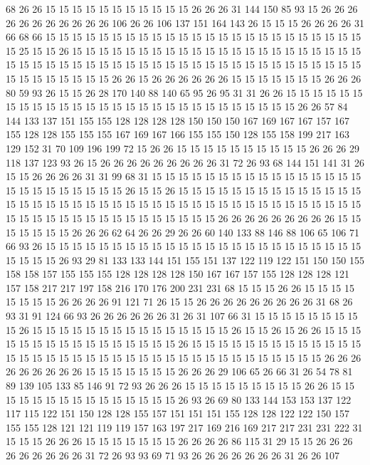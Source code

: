 68 26 26 15 15 15 15 15 15 15 15 15 15 15 26 26 26 31 144 150
85 93 15 26 26 26 26 26 26 26 26 26 26 26 106 26 26 106 137 151
164 143 26 15 15 15 26 26 26 26 31 66 68 66 15 15 15 15 15 15
15 15 15 15 15 15 15 15 15 15 15 15 15 15 15 15 15 15 15 25
15 15 26 15 15 15 15 15 15 15 15 15 15 15 15 15 15 15 15 15
15 15 15 15 15 15 15 15 15 15 15 15 15 15 15 15 15 15 15 15
15 15 15 15 15 15 15 15 15 15 15 15 15 15 15 15 15 15 15 15
26 26 15 26 26 26 26 26 26 15 15 15 15 15 15 15 26 26 26 80
59 93 26 15 15 26 28 170 140 88 140 65 95 26 95 31 31 26 26 15
15 15 15 15 15 15 15 15 15 15 15 15 15 15 15 15 15 15 15 15
15 15 15 15 15 15 15 26 26 57 84 144 133 137 151 155 155 128 128 128
128 150 150 150 167 169 167 167 157 167 155 128 128 155 155 155 167 169 167 166
155 155 150 128 155 158 199 217 163 129 152 31 70 109 196 199 72 15 26 26
15 15 15 15 15 15 15 15 15 15 26 26 26 29 118 137 123 93 26 15
26 26 26 26 26 26 26 26 26 31 72 26 93 68 144 151 141 31 26 15
15 26 26 26 26 31 31 99 68 31 15 15 15 15 15 15 15 15 15 15
15 15 15 15 15 15 15 15 15 15 15 15 15 15 15 26 15 15 26 15
15 15 15 15 15 15 15 15 15 15 15 15 15 15 15 15 15 15 15 15
15 15 15 15 15 15 15 15 15 15 15 15 15 15 15 15 15 15 15 15
15 15 15 15 15 15 15 15 15 15 15 15 15 15 15 15 26 26 26 26
26 26 26 26 26 15 15 15 15 15 15 15 26 26 26 62 64 26 26 29
26 26 60 140 133 88 146 88 106 65 106 71 66 93 26 15 15 15 15 15
15 15 15 15 15 15 15 15 15 15 15 15 15 15 15 15 15 15 15 15
15 15 15 26 93 29 81 133 133 144 151 155 151 137 122 119 122 151 150 150
155 158 158 157 155 155 155 128 128 128 128 150 167 167 157 155 128 128 128 121
157 158 217 217 197 158 216 170 176 200 231 231 68 15 15 15 26 26 15 15
15 15 15 15 15 15 26 26 26 26 91 121 71 26 15 15 26 26 26 26
26 26 26 26 26 31 68 26 93 31 91 124 66 93 26 26 26 26 26 26
31 26 31 107 66 31 15 15 15 15 15 15 15 15 15 26 15 15 15 15
15 15 15 15 15 15 15 15 15 15 15 26 15 15 26 15 26 26 15 15
15 15 15 15 15 15 15 15 15 15 15 15 15 15 26 15 15 15 15 15
15 15 15 15 15 15 15 15 15 15 15 15 15 15 15 15 15 15 15 15
15 15 15 15 15 15 15 15 15 15 15 15 26 26 26 26 26 26 26 26
26 15 15 15 15 15 15 15 26 26 26 29 106 65 26 66 31 26 54 78
81 89 139 105 133 85 146 91 72 93 26 26 26 15 15 15 15 15 15 15
15 15 26 26 15 15 15 15 15 15 15 15 15 15 15 15 15 15 15 26
93 26 69 80 133 144 153 153 137 122 117 115 122 151 150 128 128 155 157 151
151 151 155 128 128 122 122 150 157 155 155 128 121 121 119 119 157 163 197 217
169 216 169 217 217 231 231 222 31 15 15 15 26 26 26 15 15 15 15 15
15 15 26 26 26 26 86 115 31 29 15 15 26 26 26 26 26 26 26 26
26 31 72 26 93 93 69 71 93 26 26 26 26 26 26 26 31 26 26 107
